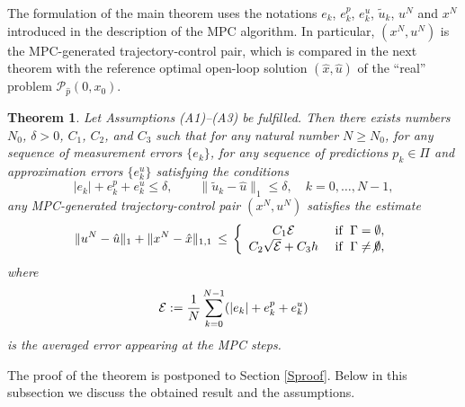 \documentclass[11pt]{article}
\newtheorem{theo}{Theorem}[section]
\newcommand{\bd}{\begin{displaymath}}
\newcommand{\ed}{\end{displaymath}}
\newcommand{\al}{\alpha}
\newcommand{\p}{{\mathcal P}}
\newcommand{\bino}{\bigskip\noindent}
\begin{document}
The formulation of the main theorem uses the notations $e_k$, $e^p_k$, $e^{u}_k$, $\tilde u_k$, $u^N$ and 
$x^N$ introduced in the description of the MPC algorithm. In particular, $(x^N, u^N)$ is the MPC-generated
trajectory-control pair, which is compared in the next theorem with the reference optimal open-loop solution $(\hat x, \hat u)$
of the ``real'' problem $\p_{\hat p}(0,x_0)$.

\begin{theo} \label{Tmain}
Let Assumptions (A1)--(A3) be fulfilled. %
Then there exists numbers $N_0$, $\delta > 0$, $C_1$, $C_2$, and $C_3$ such that 
for any natural number $N \geq N_0$, for any sequence of measurement errors $\{e_k\}$, 
for any sequence of predictions $p_k \in \varPi$ and approximation errors $\{e_k^{u}\}$ satisfying the conditions
\bd
        | e_k | + e_k^p + e_k^{u} \leq \delta, \qquad 
           \| \tilde u_k - \hat u\|_1 \leq \delta, \quad k= 0, \ldots, N-1,
\ed 
any MPC-generated trajectory-control pair $(x^N, u^N)$ satisfies the estimate  
\bd
        \| u^N - \hat u \|_1  +  \| x^N - \hat x \|_{1,1}  \, \leq \, \left\{ \begin{array}{cl} 
                         C_1{\cal E} & \mbox{ if  } \; \Gamma = \emptyset, \\
                         C_2  \sqrt{ \cal E} + C_3 h & \mbox{ if  } \; \Gamma \not= \not\emptyset,
             \end{array} \right.
\ed
where 
\bd
        {\cal E} := \frac{1}{N} \sum_{k=0}^{N-1} (|e_k| + e^{p}_k + e^{u}_k) 
\ed 
is the averaged error appearing at the MPC steps.
\end{theo}
 
\bino
The proof of the theorem is postponed to Section \ref{Sproof}.
Below in this subsection we discuss the obtained result and the assumptions.
\end{document}
